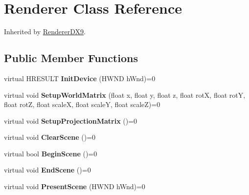 \hypertarget{class_renderer}{\section{Renderer Class Reference}
\label{class_renderer}
}


Inherited by \hyperlink{class_renderer_d_x9}{Renderer\-D\-X9}.

\subsection*{Public Member Functions}
\begin{DoxyCompactItemize}
\item 
\hypertarget{class_renderer_a6313b523d721e6c2975a669af99a4c2b}{virtual H\-R\-E\-S\-U\-L\-T {\bfseries Init\-Device} (H\-W\-N\-D h\-Wnd)=0}\label{class_renderer_a6313b523d721e6c2975a669af99a4c2b}

\item 
\hypertarget{class_renderer_adfa2a874df852968998c3ee2b50d5bd3}{virtual void {\bfseries Setup\-World\-Matrix} (float x, float y, float z, float rot\-X, float rot\-Y, float rot\-Z, float scale\-X, float scale\-Y, float scale\-Z)=0}\label{class_renderer_adfa2a874df852968998c3ee2b50d5bd3}

\item 
\hypertarget{class_renderer_ab6dd3468007966dd81900ed3c4dd5873}{virtual void {\bfseries Setup\-Projection\-Matrix} ()=0}\label{class_renderer_ab6dd3468007966dd81900ed3c4dd5873}

\item 
\hypertarget{class_renderer_ab7ed63f63bcc6726d40e2a43cc3a585e}{virtual void {\bfseries Clear\-Scene} ()=0}\label{class_renderer_ab7ed63f63bcc6726d40e2a43cc3a585e}

\item 
\hypertarget{class_renderer_a32e27baaab853cc2d24605b831bcda75}{virtual bool {\bfseries Begin\-Scene} ()=0}\label{class_renderer_a32e27baaab853cc2d24605b831bcda75}

\item 
\hypertarget{class_renderer_abdf143dedfb79932050c37cf0f4449bd}{virtual void {\bfseries End\-Scene} ()=0}\label{class_renderer_abdf143dedfb79932050c37cf0f4449bd}

\item 
\hypertarget{class_renderer_a9dfa1935125f68f2c169c447a66aaf39}{virtual void {\bfseries Present\-Scene} (H\-W\-N\-D h\-Wnd)=0}\label{class_renderer_a9dfa1935125f68f2c169c447a66aaf39}


\end{DoxyCompactItemize}
